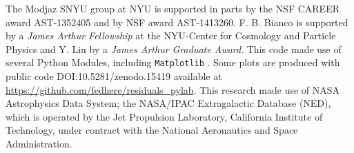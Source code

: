 \documentclass{emulateapj}
\begin{document}



\acknowledgements
The Modjaz SNYU group at NYU is supported in parts by the NSF CAREER award AST-1352405 and by NSF award AST-1413260. F. B. Bianco is supported by a \emph{James Arthur Fellowship} at the NYU-Center for Cosmology and Particle Physics and Y. Liu by a \emph{James Arthur Graduate Award}.
This code made use of  several Python Modules, including \verb=Matplotlib= \citep{hunter07}.
Some plots are  produced with public code DOI:10.5281/zenodo.15419 available at \url{https://github.com/fedhere/residuals_pylab}.
This research made use of NASA Astrophysics Data
System; the NASA/IPAC Extragalactic Database (NED), which
is operated by the Jet Propulsion Laboratory, California Institute
of Technology, under contract with the National Aeronautics
and Space Administration.
\end{document}
